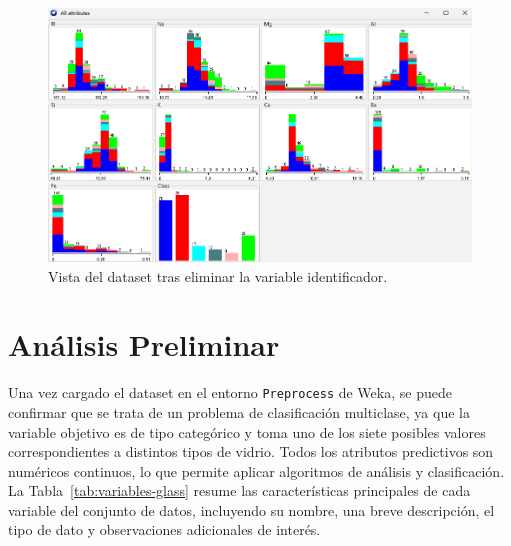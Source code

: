 \documentclass{article}
\begin{document}
\begin{figure}[!ht]
    \centering
    \includegraphics[width=1\linewidth]{Imágenes/dataset-sin-id.png}
    \caption{Vista del dataset tras eliminar la variable identificador.}
    \label{fig:dataset-sin-id}
\end{figure}

\section{Análisis Preliminar}\label{sec:seleccion-caracteristicas}

Una vez cargado el dataset en el entorno \texttt{Preprocess} de Weka, se puede confirmar que se trata de un problema de clasificación multiclase, ya que la variable objetivo es de tipo categórico y toma uno de los siete posibles valores correspondientes a distintos tipos de vidrio. Todos los atributos predictivos son numéricos continuos, lo que permite aplicar algoritmos de análisis y clasificación.\\

La Tabla~\ref{tab:variables-glass} resume las características principales de cada variable del conjunto de datos, incluyendo su nombre, una breve descripción, el tipo de dato y observaciones adicionales de interés.\\
\end{document}
